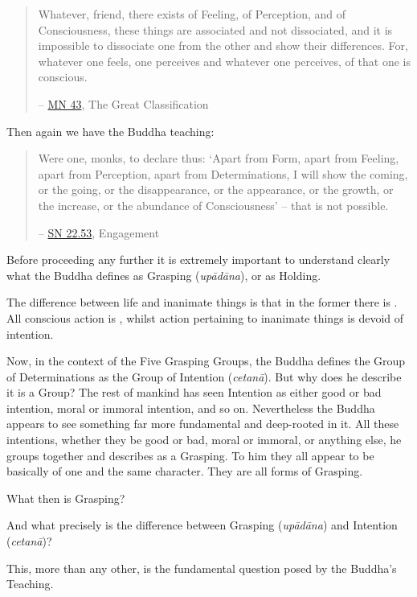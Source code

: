 \begin{quote}
Whatever, friend, there exists of Feeling, of Perception, and of Consciousness, these things are associated and not dissociated, and it is impossible to dissociate one from the other and show their differences. For, whatever one feels, one perceives and whatever one perceives, of that one is conscious.

 -- \href{https://suttacentral.net/mn43/en/sujato}{MN 43}, The Great Classification
\end{quote}

Then again we have the Buddha teaching:

\begin{quote}
Were one, monks, to declare thus: `Apart from Form, apart from Feeling, apart from Perception, apart from Determinations, I will show the coming, or the going, or the disappearance, or the appearance, or the growth, or the increase, or the abundance of Consciousness' -- that is not possible.

 -- \href{https://suttacentral.net/sn22.53/en/bodhi}{SN 22.53}, Engagement
\end{quote}

Before proceeding any further it is extremely important to understand clearly what the Buddha defines as Grasping (\emph{upādāna}), or as Holding.

The difference between life and inanimate things is that in the former there is . All conscious action is , whilst action pertaining to inanimate things is devoid of intention.

Now, in the context of the Five Grasping Groups, the Buddha defines the Group of Determinations as the Group of Intention (\emph{cetanā}). But why does he describe it is a  Group? The rest of mankind has seen Intention as either good or bad intention, moral or immoral intention, and so on. Nevertheless the Buddha appears to see something far more fundamental and deep-rooted in it. All these intentions, whether they be good or bad, moral or immoral, or anything else, he groups together and describes as a Grasping. To him they all appear to be basically of one and the same character. They are all forms of Grasping.

What then is Grasping?

And what precisely is the difference between Grasping (\emph{upādāna}) and Intention (\emph{cetanā})?

This, more than any other, is the fundamental question posed by the Buddha's Teaching.

